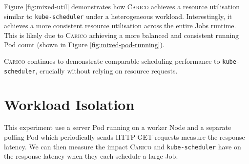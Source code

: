 Figure \ref{fig:mixed-util} demonstrates how \textsc{Carico} achieves a resource
utilisation similar to \texttt{kube-scheduler} under a heterogeneous workload.
Interestingly, it achieves a more consistent resource utilisation across the
entire Jobs runtime. This is likely due to \textsc{Carico} achieving a more
balanced and consistent running Pod count (shown in Figure
\ref{fig:mixed-pod-running}).

\textsc{Carico} continues to demonstrate comparable scheduling performance to
\texttt{kube-scheduler}, crucially without relying on resource requests.

\section{Workload Isolation}
\label{sec:eval-isolation}
This experiment use a server Pod running on a worker Node and a separate polling
Pod which periodically sends HTTP GET requests measure the response latency. We
can then measure the impact \textsc{Carico} and \texttt{kube-scheduler} have on
the response latency when they each schedule a large Job.

%

